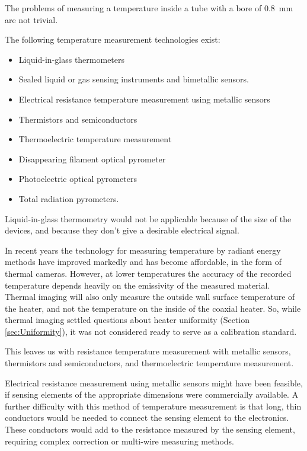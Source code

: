 The problems of measuring a temperature inside a tube with a bore of
\SI{0.8}{\milli\metre} are not trivial.

The following temperature measurement technologies exist:
\begin{itemize}
	\item Liquid-in-glass thermometers
	\item Sealed liquid or gas sensing instruments and bimetallic sensors.
	\item Electrical resistance temperature measurement using metallic sensors
	\item Thermistors and semiconductors
	\item Thermoelectric temperature measurement
	\item Disappearing filament optical pyrometer
	\item Photoelectric optical pyrometers
	\item Total radiation pyrometers.
\end{itemize}

Liquid-in-glass thermometry would not be applicable because of the size of the
devices, and because they don't give a desirable electrical signal. 

In recent years the technology for measuring temperature by radiant energy
methods have improved markedly and has become affordable, in the form of thermal
cameras. However, at lower temperatures the accuracy of the recorded temperature
depends heavily on the emissivity of the measured material. Thermal imaging will
also only measure the outside wall surface temperature of the heater, and not
the temperature on the inside of the coaxial heater. So, while thermal imaging
settled questions about heater uniformity (Section \ref{sec:Uniformity}), it was
not considered ready to serve as a calibration standard. 

This leaves us with resistance temperature measurement with metallic sensors,
thermistors and semiconductors, and thermoelectric temperature measurement.

Electrical resistance measurement using metallic sensors might have been
feasible, if sensing elements of the appropriate dimensions were commercially
available. A further difficulty with this method of temperature measurement is
that long, thin conductors would be needed to connect the sensing element to the
electronics. These conductors would add to the resistance measured by the
sensing element, requiring complex correction or multi-wire measuring methods.

